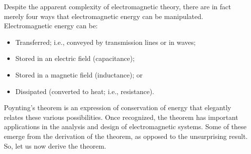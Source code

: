 

\label{m0073_Poyntings_Theorem} %

Despite the apparent complexity of electromagnetic theory, there are in fact merely four ways that electromagnetic energy can be manipulated.
Electromagnetic energy can be:
%
\begin{itemize}
\item Transferred; i.e., conveyed  by transmission lines or in waves; 
\item Stored in an electric field (capacitance);
\item Stored in a magnetic field (inductance); or 
\item Dissipated (converted to heat; i.e., resistance).  
\end{itemize}
%
Poynting's theorem is an expression of conservation of energy that elegantly relates these various possibilities.
Once recognized, the theorem has important applications in the analysis and design of electromagnetic systems.  
Some of these emerge from the derivation of the theorem, as opposed to the unsurprising result. 
So, let us now derive the theorem.

